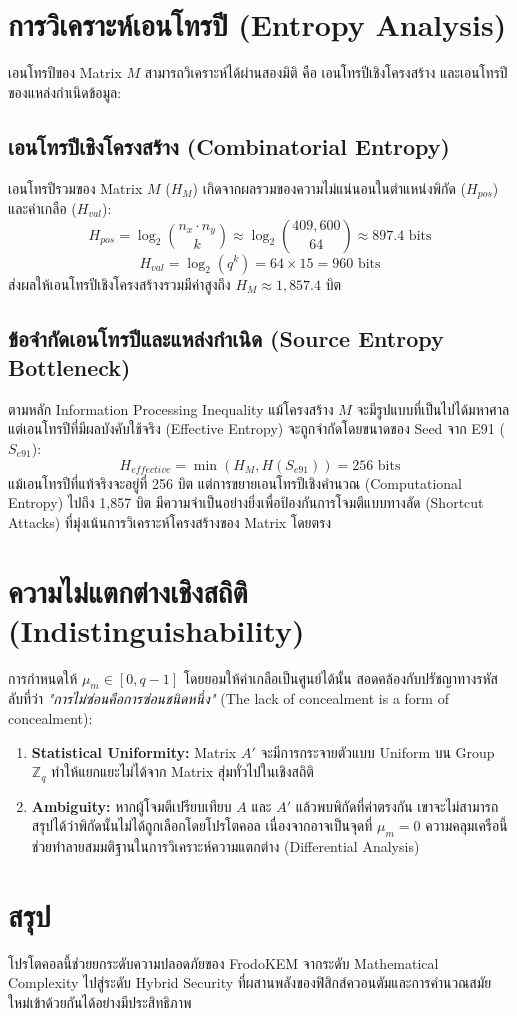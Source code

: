 \documentclass[twocolumn, a4paper]{article}
\begin{document}
	
	\section{การวิเคราะห์เอนโทรปี (Entropy Analysis)}
	เอนโทรปีของ Matrix $M$ สามารถวิเคราะห์ได้ผ่านสองมิติ คือ เอนโทรปีเชิงโครงสร้าง และเอนโทรปีของแหล่งกำเนิดข้อมูล:
	
	\subsection{เอนโทรปีเชิงโครงสร้าง (Combinatorial Entropy)}
	เอนโทรปีรวมของ Matrix $M$ ($H_M$) เกิดจากผลรวมของความไม่แน่นอนในตำแหน่งพิกัด ($H_{pos}$) และค่าเกลือ ($H_{val}$):
	\begin{equation}
		H_{pos} = \log_2 \binom{n_x \cdot n_y}{k} \approx \log_2 \binom{409,600}{64} \approx 897.4 \text{ bits}
	\end{equation}
	\begin{equation}
		H_{val} = \log_2 (q^k) = 64 \times 15 = 960 \text{ bits}
	\end{equation}
	ส่งผลให้เอนโทรปีเชิงโครงสร้างรวมมีค่าสูงถึง $H_M \approx 1,857.4$ บิต
	
	\subsection{ข้อจำกัดเอนโทรปีและแหล่งกำเนิด (Source Entropy Bottleneck)}
	ตามหลัก Information Processing Inequality แม้โครงสร้าง $M$ จะมีรูปแบบที่เป็นไปได้มหาศาล แต่เอนโทรปีที่มีผลบังคับใช้จริง (Effective Entropy) จะถูกจำกัดโดยขนาดของ Seed จาก E91 ($S_{e91}$):
	\begin{equation}
		H_{effective} = \min(H_M, H(S_{e91})) = 256 \text{ bits}
	\end{equation}
	แม้เอนโทรปีที่แท้จริงจะอยู่ที่ 256 บิต แต่การขยายเอนโทรปีเชิงคำนวณ (Computational Entropy) ไปถึง 1,857 บิต มีความจำเป็นอย่างยิ่งเพื่อป้องกันการโจมตีแบบทางลัด (Shortcut Attacks) ที่มุ่งเน้นการวิเคราะห์โครงสร้างของ Matrix โดยตรง
	
	
	\section{ความไม่แตกต่างเชิงสถิติ (Indistinguishability)}
	การกำหนดให้ $\mu_m \in [0, q-1]$ โดยยอมให้ค่าเกลือเป็นศูนย์ได้นั้น สอดคล้องกับปรัชญาทางรหัสลับที่ว่า \textit{"การไม่ซ่อนคือการซ่อนชนิดหนึ่ง"} (The lack of concealment is a form of concealment):
	\begin{enumerate}
		\item \textbf{Statistical Uniformity:} Matrix $A'$ จะมีการกระจายตัวแบบ Uniform บน Group $\mathbb{Z}_q$ ทำให้แยกแยะไม่ได้จาก Matrix สุ่มทั่วไปในเชิงสถิติ
		\item \textbf{Ambiguity:} หากผู้โจมตีเปรียบเทียบ $A$ และ $A'$ แล้วพบพิกัดที่ค่าตรงกัน เขาจะไม่สามารถสรุปได้ว่าพิกัดนั้นไม่ได้ถูกเลือกโดยโปรโตคอล เนื่องจากอาจเป็นจุดที่ $\mu_m = 0$ ความคลุมเครือนี้ช่วยทำลายสมมติฐานในการวิเคราะห์ความแตกต่าง (Differential Analysis)
	\end{enumerate}
	
	
	\section{สรุป}
	โปรโตคอลนี้ช่วยยกระดับความปลอดภัยของ FrodoKEM จากระดับ Mathematical Complexity ไปสู่ระดับ Hybrid Security ที่ผสานพลังของฟิสิกส์ควอนตัมและการคำนวณสมัยใหม่เข้าด้วยกันได้อย่างมีประสิทธิภาพ
	
\end{document}
